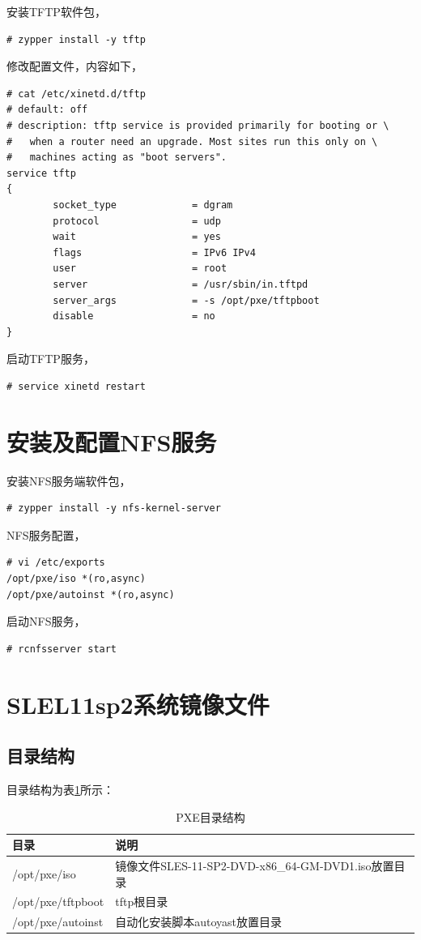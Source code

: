 安装TFTP软件包，
\begin{verbatim}
# zypper install -y tftp  
\end{verbatim}

修改配置文件，内容如下，
\begin{verbatim}
# cat /etc/xinetd.d/tftp 
# default: off
# description: tftp service is provided primarily for booting or \
#   when a router need an upgrade. Most sites run this only on \
#   machines acting as "boot servers".
service tftp
{
        socket_type             = dgram
        protocol                = udp
        wait                    = yes
        flags                   = IPv6 IPv4
        user                    = root
        server                  = /usr/sbin/in.tftpd
        server_args             = -s /opt/pxe/tftpboot
        disable                 = no 
}  
\end{verbatim}

启动TFTP服务，

\begin{verbatim}
# service xinetd restart  
\end{verbatim}

\section{安装及配置NFS服务}
\label{sec:InstallNFS}

安装NFS服务端软件包，
\begin{verbatim}
# zypper install -y nfs-kernel-server  
\end{verbatim}

NFS服务配置，
\begin{verbatim}
# vi /etc/exports
/opt/pxe/iso *(ro,async)  
/opt/pxe/autoinst *(ro,async)
\end{verbatim}

启动NFS服务，
\begin{verbatim}
# rcnfsserver start  
\end{verbatim}

\section{SLEL11sp2系统镜像文件}
\label{sles11sp2Image}

\subsection{目录结构}
目录结构为表\ref{PxeDir}所示：
\begin{table}[hbtp]
  \centering
    \begin{tabular}{ll}
      \toprule
      目录           & 说明 \\
      \midrule
      /opt/pxe/iso       & 镜像文件SLES-11-SP2-DVD-x86\_64-GM-DVD1.iso放置目录 \\
      /opt/pxe/tftpboot  & tftp根目录 \\
      /opt/pxe/autoinst  & 自动化安装脚本autoyast放置目录 \\
      \bottomrule
    \end{tabular}
    \caption{PXE目录结构}\label{PxeDir}
\end{table}

